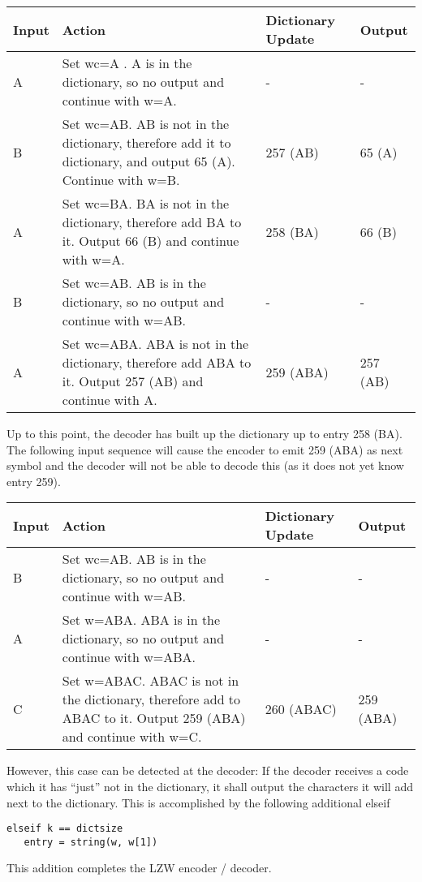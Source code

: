 \begin{longtabu} to \textwidth {
    |X[1,c]|X[5,l]|X[1,c]|X[1,c]|}
  \hline Input & Action & Dictionary Update & Output \\ \hline
  A & Set wc=A . A is in the dictionary, so no output and continue with w=A. & - & - \\ \hline
  B & Set wc=AB. AB is not in the dictionary, therefore add it to dictionary, and output 65 (A). Continue with w=B. & 257 (AB) & 65 (A) \\ \hline
  A & Set wc=BA. BA is not in the dictionary, therefore add BA to it. Output 66 (B) and continue with w=A. & 258 (BA) & 66 (B) \\ \hline
  B & Set wc=AB. AB is in the dictionary, so no output and continue with w=AB. & - & - \\ \hline
  A & Set wc=ABA. ABA is not in the dictionary, therefore add ABA to it. Output 257 (AB) and continue with A. & 259 (ABA) & 257 (AB) \\ \hline
\end{longtabu}

Up to this point, the decoder has built up the dictionary up to entry 258 (BA). The following input sequence will cause the encoder to emit 259 (ABA) as next symbol and the decoder will not be able to decode this (as it does not yet know entry 259).

\begin{longtabu} to \textwidth {
    |X[1,c]|X[5,l]|X[1,c]|X[1,c]|}
  \hline Input & Action & Dictionary Update & Output \\ \hline
  B & Set wc=AB. AB is in the dictionary, so no output and continue with w=AB. & - & - \\ \hline
  A & Set w=ABA. ABA is in the dictionary, so no output and continue with w=ABA. & - & - \\ \hline
  C & Set w=ABAC. ABAC is not in the dictionary, therefore add to ABAC to it. Output 259 (ABA) and continue with w=C. & 260 (ABAC) & 259 (ABA) \\ \hline
\end{longtabu}

However, this case can be detected at the decoder: If the decoder receives a code which it has ``just'' not in the dictionary, it shall output the characters it will add next to the dictionary. This is accomplished by the following additional elseif

\begin{verbatim}
elseif k == dictsize
   entry = string(w, w[1])
\end{verbatim}

This addition completes the LZW encoder / decoder.

